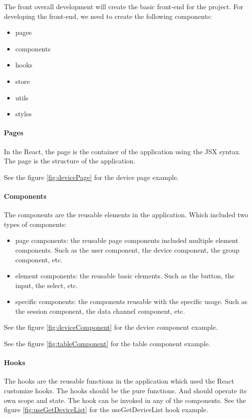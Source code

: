 The front overall development will create the basic front-end for the project.
For developing the front-end, we need to create the following components:
\begin{itemize}
    \item pages
    \item components
    \item hooks
    \item store
    \item utils
    \item styles
\end{itemize}

\paragraph{Pages}
In the React, the page is the container of the application using the JSX syntax.
The page is the structure of the application. 

See the figure \ref{fig:devicePage} for the device page example.



\paragraph{Components}
The components are the reusable elements in the application.
Which included two types of components: 
\begin{itemize}
    \item page components: the reusable page components included multiple element components. 
    Such as the user component, the device component, the group component, etc.
    \item element components: the reusable basic elements.
    Such as the button, the input, the select, etc.
    \item specific components: the components reusable with the specific usage.
    Such as the session component, the data channel component, etc.
\end{itemize}

See the figure \ref{fig:deviceComponent} for the device component example.

See the figure \ref{fig:tableComponent} for the table component example.




\paragraph{Hooks}
The hooks are the reusable functions in the application which used the React customize hooks.
The hooks should be the pure functions. And should operate its own scope and state.
The hook can be invoked in any of the components. 
See the figure \ref{fig:useGetDeviceList} for the useGetDeviceList hook example.

